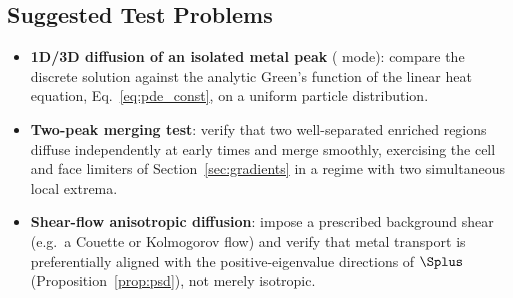 \subsection{Suggested Test Problems}
\begin{itemize}
  \item \textbf{1D/3D diffusion of an isolated metal peak}
        ( mode): compare the discrete solution
        against the analytic Green's function of the linear heat
        equation, Eq.~\eqref{eq:pde_const}, on a uniform particle
        distribution.
  \item \textbf{Two-peak merging test}: verify that two well-separated
        enriched regions diffuse independently at early times and merge
        smoothly, exercising the cell and face limiters of
        Section~\ref{sec:gradients} in a regime with two simultaneous
        local extrema.
  \item \textbf{Shear-flow anisotropic diffusion}: impose a prescribed
        background shear (e.g.\ a Couette or Kolmogorov flow) and verify
        that metal transport is preferentially aligned with the
        positive-eigenvalue directions of $\Splus$
        (Proposition~\ref{prop:psd}), not merely isotropic.
\end{itemize}
